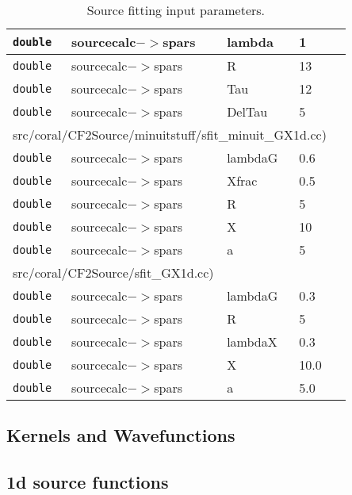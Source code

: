 \documentclass[10pt]{article}
\begin{document}
\begin{table}
\begin{tabular}{lllll}
                {\tt double} & sourcecalc$->$spars & lambda & 1 & \\\hline
                {\tt double} & sourcecalc$->$spars & R & 13 & \\\hline
                {\tt double} & sourcecalc$->$spars & Tau & 12 & \\\hline
                {\tt double} & sourcecalc$->$spars & DelTau & 5 & \\\hline
           	\multicolumn{4}{l}{ src/coral/CF2Source/minuitstuff/sfit\_minuit\_GX1d.cc) }\\\hline
                {\tt double} & sourcecalc$->$spars & lambdaG & 0.6 & \\\hline
                {\tt double} & sourcecalc$->$spars & Xfrac & 0.5 & \\\hline
                {\tt double} & sourcecalc$->$spars & R & 5 & \\\hline
                {\tt double} & sourcecalc$->$spars & X & 10 & \\\hline
                {\tt double} & sourcecalc$->$spars & a & 5 & \\\hline
            	\multicolumn{4}{l}{ src/coral/CF2Source/sfit\_GX1d.cc) }\\\hline
                {\tt double} & sourcecalc$->$spars & lambdaG & 0.3 & \\\hline
                {\tt double} & sourcecalc$->$spars & R & 5 & \\\hline
                {\tt double} & sourcecalc$->$spars & lambdaX & 0.3 & \\\hline
                {\tt double} & sourcecalc$->$spars & X & 10.0 & \\\hline
                {\tt double} & sourcecalc$->$spars & a & 5.0 & \\\hline
            \end{tabular}
            \caption{Source fitting input parameters.}
            \label{sfitParameters}
        \end{table}
        
\subsection{Kernels and Wavefunctions}

\subsection{1d source functions}
\end{document}
